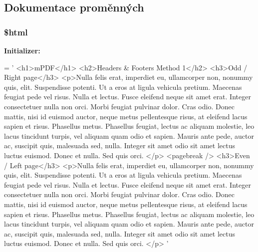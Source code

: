 \subsection{Dokumentace proměnných}
\hypertarget{example15__headers__method__1_8php_a6f96e7fc92441776c9d1cd3386663b40}{
\subsubsection[{\$html}]{\setlength{\rightskip}{0pt plus 5cm}\$html}}\label{example15__headers__method__1_8php_a6f96e7fc92441776c9d1cd3386663b40}
{\bfseries Initializer\-:}
\begin{DoxyCode}
= \textcolor{stringliteral}{'}
\textcolor{stringliteral}{<h1>mPDF</h1>}
\textcolor{stringliteral}{<h2>Headers & Footers Method 1</h2>}
\textcolor{stringliteral}{<h3>Odd / Right page</h3>}
\textcolor{stringliteral}{<p>Nulla felis erat, imperdiet eu, ullamcorper non, nonummy quis, elit. Suspendisse potenti. Ut a eros at
       ligula vehicula pretium. Maecenas feugiat pede vel risus. Nulla et lectus. Fusce eleifend neque sit amet
       erat. Integer consectetuer nulla non orci. Morbi feugiat pulvinar dolor. Cras odio. Donec mattis, nisi id
       euismod auctor, neque metus pellentesque risus, at eleifend lacus sapien et risus. Phasellus metus. Phasellus
       feugiat, lectus ac aliquam molestie, leo lacus tincidunt turpis, vel aliquam quam odio et sapien. Mauris ante
       pede, auctor ac, suscipit quis, malesuada sed, nulla. Integer sit amet odio sit amet lectus luctus euismod.
       Donec et nulla. Sed quis orci. </p>}
\textcolor{stringliteral}{<pagebreak />}
\textcolor{stringliteral}{<h3>Even / Left page</h3>}
\textcolor{stringliteral}{<p>Nulla felis erat, imperdiet eu, ullamcorper non, nonummy quis, elit. Suspendisse potenti. Ut a eros at
       ligula vehicula pretium. Maecenas feugiat pede vel risus. Nulla et lectus. Fusce eleifend neque sit amet
       erat. Integer consectetuer nulla non orci. Morbi feugiat pulvinar dolor. Cras odio. Donec mattis, nisi id
       euismod auctor, neque metus pellentesque risus, at eleifend lacus sapien et risus. Phasellus metus. Phasellus
       feugiat, lectus ac aliquam molestie, leo lacus tincidunt turpis, vel aliquam quam odio et sapien. Mauris ante
       pede, auctor ac, suscipit quis, malesuada sed, nulla. Integer sit amet odio sit amet lectus luctus euismod.
       Donec et nulla. Sed quis orci. </p>}
\textcolor{stringliteral}{'}
\end{DoxyCode}



